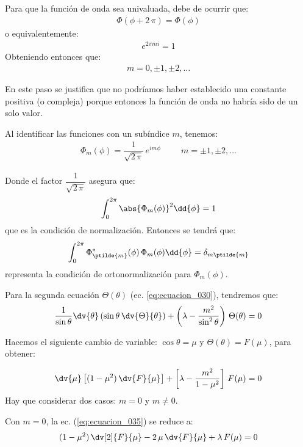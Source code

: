 Para que la función de onda sea univaluada, debe de ocurrir que:
\begin{align}
\Phi(\phi +  2 \, \pi) = \Phi(\phi)
\label{eq:ecuacion_031}
\end{align}
o equivalentemente:
\begin{align*}
e^{2 \pi m i} = 1
\end{align*}
Obteniendo entonces que:
\begin{align*}
m = 0, \pm 1, \pm 2, \ldots
\end{align*}

En este paso se justifica que no podríamos haber establecido una constante positiva (o compleja) porque entonces la función de onda no habría sido de un solo valor.
\par
Al identificar las funciones con un subíndice $m$, tenemos:
\begin{align}
\Phi_{m}(\phi) = \dfrac{1}{\sqrt{2 \, \pi}} \, e^{i m \phi} \hspace{1cm} m = \pm 1, \pm 2, \ldots
\label{eq:ecuacion_032}
\end{align}

Donde el factor $\dfrac{1}{\sqrt{2 \, \pi}}$ asegura que:
\begin{align*}
\int_{0}^{2 \pi} \abs{\Phi_{m}(\phi)}^{2} \dd{\phi} = 1
\end{align*}
que es la condición de normalización. Entonces se tendrá que:
\begin{align}
\int_{0}^{2 \pi} \Phi_{\ptilde{m}}^{*}(\phi) \, \Phi_{m}(\phi) \dd{\phi} = \delta_{m \ptilde{m}}
\label{eq:ecuacion_033}
\end{align}
representa la condición de ortonormalización para $\Phi_{m}(\phi)$.
\par
Para la segunda ecuación $\Theta (\theta)$ (ec. \ref{eq:ecuacion_030}), tendremos que:
\begin{align}
\dfrac{1}{\sin \theta} \dv{\theta} \left( \sin \theta \, \dv{\Theta}{\theta} \right) + \left( \lambda - \dfrac{m^{2}}{\sin^{2} \theta} \right) \, \Theta (\theta) = 0
\label{eq:ecuacion_034}
\end{align}

Hacemos el siguiente cambio de variable: $\cos \theta = \mu$ y $\Theta(\theta) = F(\mu)$, para obtener:

\begin{align}
\dv{\mu} \left[ (1 - \mu^{2}) \, \dv{F}{\mu} \right] + \left[ \lambda - \dfrac{m^{2}}{1 - \mu^{2}} \right] \, F(\mu) = 0
\label{eq:ecuacion_035}
\end{align}
Hay que considerar dos casos: $m = 0$ y $m \neq 0$. 
\par
Con $m = 0$, la ec. (\ref{eq:ecuacion_035}) se reduce a:
\begin{align}
(1 - \mu^{2}) \, \dv[2]{F}{\mu} - 2  \, \mu \, \dv{F}{\mu} + \lambda \, F(\mu) = 0
\label{eq:ecuacion_036}
\end{align}

